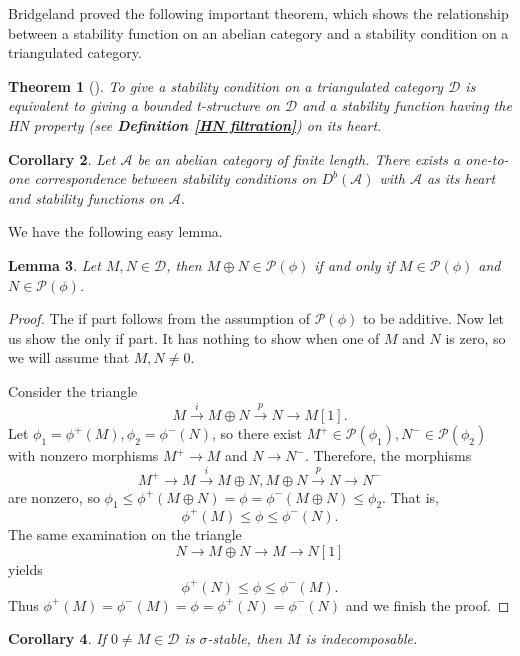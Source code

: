 \documentclass[a4paper,12pt]{amsart}
\newtheorem{theorem}{Theorem}[section]
\newtheorem{lemma}[theorem]{Lemma}
\newtheorem{corollary}[theorem]{Corollary}
\begin{document}
Bridgeland proved the following important theorem, which shows the relationship between a stability function on an abelian category and a stability condition on a triangulated category.
\begin{theorem}[{\cite[Proposition 5.3]{Bri2002}}]\label{heart}
    To give a stability condition on a triangulated category $\mathcal{D}$ is equivalent to giving a bounded t-structure on $\mathcal{D}$ and a stability function having the HN property (see \textbf{Definition \ref{HN filtration}}) on its heart.
\end{theorem}
\begin{corollary}
    Let $\mathcal{A}$ be an abelian category of finite length. There exists a one-to-one correspondence between stability conditions on $D^b(\mathcal{A})$ with $\mathcal{A}$ as its heart and stability functions on $\mathcal{A}$. 
\end{corollary}
We have the following easy lemma.
\begin{lemma}\label{semistable vs direct sum}
    Let $M,N\in\mathcal{D}$, then $M\oplus N\in\mathcal{P}(\phi)$ if and only if $M\in\mathcal{P}(\phi)$ and $N\in\mathcal{P}(\phi)$.
\end{lemma}
\begin{proof}
    The if part follows from the assumption of $\mathcal{P}(\phi)$ to be additive. Now let us show the only if part. It has nothing to show when one of $M$ and $N$ is zero, so we will assume that $M,N\neq 0$.

    Consider the triangle
    \[M\xrightarrow{i} M\oplus N\xrightarrow{p} N\rightarrow M[1].\]
    Let $\phi_1=\phi^+(M),\phi_2=\phi^-(N)$, so there exist $M^+\in\mathcal{P}(\phi_1),N^-\in\mathcal{P}(\phi_2)$ with nonzero morphisms $M^+\rightarrow M$ and $N\rightarrow N^-$. Therefore, the morphisms
    \[M^+\rightarrow M\xrightarrow{i}M\oplus N, M\oplus N\xrightarrow{p}N\rightarrow N^-\]
    are nonzero, so $\phi_1\leqslant\phi^+(M\oplus N)=\phi=\phi^-(M\oplus N)\leqslant\phi_2$. That is,
    \[\phi^+(M)\leqslant\phi\leqslant\phi^-(N).\]
    The same examination on the triangle
    \[N\rightarrow M\oplus N\rightarrow M\rightarrow N[1]\]
    yields
    \[\phi^+(N)\leqslant\phi\leqslant\phi^-(M).\]
    Thus $\phi^+(M)=\phi^-(M)=\phi=\phi^+(N)=\phi^-(N)$ and we finish the proof.
\end{proof}
\begin{corollary}\label{Stable is indecomposable}
    If $0\neq M\in\mathcal{D}$ is $\sigma$-stable, then $M$ is indecomposable.
\end{corollary}
\end{document}
